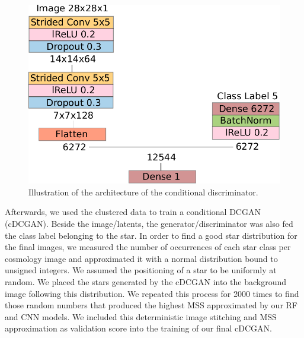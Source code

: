 \documentclass[10pt,conference,compsocconf]{IEEEtran}
\begin{document}

\begin{figure}[hb]
    \centering
    \includegraphics[width=0.73\columnwidth]{assets/cdis_arch.pdf}
    \caption{Illustration of the architecture of the conditional discriminator.}
    \label{fig:cdis_arch}
\end{figure}

Afterwards, we used the clustered data to train a conditional DCGAN (cDCGAN). Beside the image/latents, the generator/discriminator was also fed the class label belonging to the star. In order to find a good star distribution for the final images, we measured the number of occurrences of each star class per cosmology image and approximated it with a normal distribution bound to unsigned integers. We assumed the positioning of a star to be uniformly at random. We placed the stars generated by the cDCGAN into the background image following this distribution. We repeated this process for \SI{2000}{} times to find those random numbers that produced the highest MSS approximated by our RF and CNN models. We included this deterministic image stitching and MSS approximation as validation score into the training of our final cDCGAN.
\end{document}
